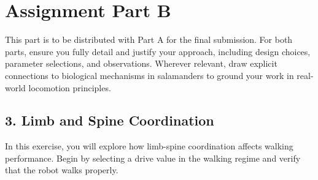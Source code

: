 \documentclass{cmc}
\begin{document}
\pagestyle{fancy}
 

\section {Assignment \- Part B}

This part is to be distributed with Part A for the final submission.
For both parts, ensure you fully detail and justify your approach, including design choices, parameter selections, and observations.
Wherever relevant, draw explicit connections to biological mechanisms in salamanders to ground your work in real-world locomotion principles.

\subsection*{3. Limb and Spine Coordination}\label{sec:limb-spine-coordination}

In this exercise, you will explore how limb-spine coordination affects walking performance.
Begin by selecting a drive value in the walking regime and verify that the robot walks properly.
\end{document}
